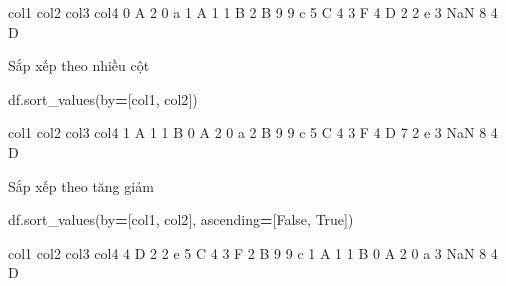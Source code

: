 \documentclass[
]{book}
\newenvironment{Shaded}{\begin{snugshade}}{\end{snugshade}}
\newcommand{\NormalTok}[1]{#1}
\newcommand{\OperatorTok}[1]{\textcolor[rgb]{0.81,0.36,0.00}{\textbf{#1}}}
\newcommand{\StringTok}[1]{\textcolor[rgb]{0.31,0.60,0.02}{#1}}
\newcommand{\VariableTok}[1]{\textcolor[rgb]{0.00,0.00,0.00}{#1}}
\begin{document}
\begin{Shaded}
\begin{Highlighting}[]
\NormalTok{  col1  col2  col3 col4}
\NormalTok{0    A     2     0    a}
\NormalTok{1    A     1     1    B}
\NormalTok{2    B     9     9    c}
\NormalTok{5    C     4     3    F}
\NormalTok{4    D     2     2    e}
\NormalTok{3  NaN     8     4    D}
\end{Highlighting}
\end{Shaded}

Sắp xếp theo nhiều cột

\begin{Shaded}
\begin{Highlighting}[]
\NormalTok{df.sort\_values(by}\OperatorTok{=}\NormalTok{[}\StringTok{\textquotesingle{}col1\textquotesingle{}}\NormalTok{, }\StringTok{\textquotesingle{}col2\textquotesingle{}}\NormalTok{])}
\end{Highlighting}
\end{Shaded}

\begin{Shaded}
\begin{Highlighting}[]
\NormalTok{  col1  col2  col3 col4}
\NormalTok{1    A     1     1    B}
\NormalTok{0    A     2     0    a}
\NormalTok{2    B     9     9    c}
\NormalTok{5    C     4     3    F}
\NormalTok{4    D     7     2    e}
\NormalTok{3  NaN     8     4    D}
\end{Highlighting}
\end{Shaded}

Sắp xếp theo tăng giảm

\begin{Shaded}
\begin{Highlighting}[]
\NormalTok{df.sort\_values(by}\OperatorTok{=}\NormalTok{[}\StringTok{\textquotesingle{}col1\textquotesingle{}}\NormalTok{, }\StringTok{\textquotesingle{}col2\textquotesingle{}}\NormalTok{], ascending}\OperatorTok{=}\NormalTok{[}\VariableTok{False}\NormalTok{, }\VariableTok{True}\NormalTok{])}
\end{Highlighting}
\end{Shaded}

\begin{Shaded}
\begin{Highlighting}[]
\NormalTok{  col1  col2  col3 col4}
\NormalTok{4    D     2     2    e}
\NormalTok{5    C     4     3    F}
\NormalTok{2    B     9     9    c}
\NormalTok{1    A     1     1    B}
\NormalTok{0    A     2     0    a}
\NormalTok{3  NaN     8     4    D}
\end{Highlighting}
\end{Shaded}
\end{document}
